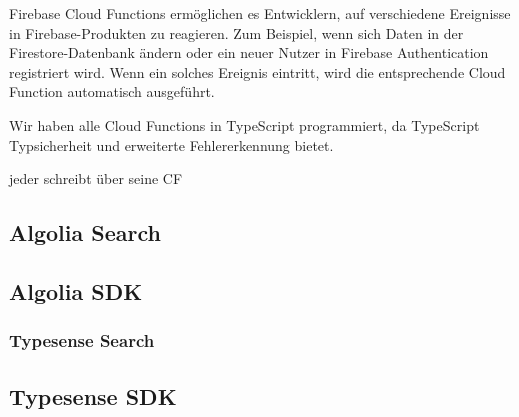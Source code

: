 Firebase Cloud Functions ermöglichen es Entwicklern, auf verschiedene Ereignisse in Firebase-Produkten zu reagieren. Zum Beispiel, wenn sich Daten in der Firestore-Datenbank ändern oder ein neuer Nutzer in Firebase Authentication registriert wird. Wenn ein solches Ereignis eintritt, wird die entsprechende Cloud Function automatisch ausgeführt.

Wir haben alle Cloud Functions in TypeScript programmiert,
da TypeScript Typsicherheit und erweiterte Fehlererkennung
bietet.


jeder schreibt über seine CF

\subsection{Algolia Search}
\subsection{Algolia SDK}

\subsubsection{Typesense Search}
\subsection{Typesense SDK}
